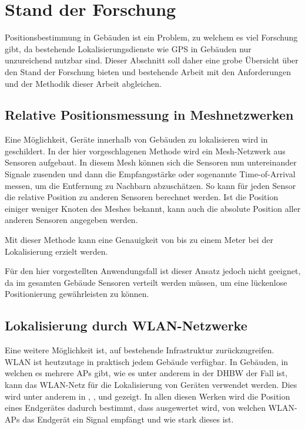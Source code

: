 \section{Stand der Forschung} \label{sec:stand-der-forschung}

Positionsbestimmung in Gebäuden ist ein Problem, zu welchem es viel Forschung gibt, da bestehende
Lokalisierungsdienste wie \gls{GPS} in Gebäuden nur unzureichend nutzbar sind. Dieser Abschnitt soll
daher eine grobe Übersicht über den Stand der Forschung bieten und bestehende Arbeit mit den
Anforderungen und der Methodik dieser Arbeit abgleichen.

\subsection{Relative Positionsmessung in Meshnetzwerken}

Eine Möglichkeit, Geräte innerhalb von Gebäuden zu lokalisieren wird in \cite{Patwari2003}
geschildert. In der hier vorgeschlagenen Methode wird ein \gls{Mesh-Netzwerk} aus Sensoren aufgebaut.
In diesem Mesh können sich die Sensoren nun untereinander Signale zusenden und dann die
Empfangsstärke oder sogenannte Time-of-Arrival messen, um die Entfernung zu Nachbarn abzuschätzen.
So kann für jeden Sensor die relative Position zu anderen Sensoren berechnet werden.
Ist die Position einiger weniger Knoten des Meshes bekannt, kann auch die absolute Position aller
anderen Sensoren angegeben werden.

Mit dieser Methode kann eine Genauigkeit von bis zu einem Meter bei der Lokalisierung erzielt
werden.

Für den hier vorgestellten Anwendungsfall ist dieser Ansatz jedoch nicht geeignet, da im gesamten
Gebäude Sensoren verteilt werden müssen, um eine lückenlose Positionierung gewährleisten zu können.

\subsection{Lokalisierung durch \gls{WLAN}-Netzwerke}

Eine weitere Möglichkeit ist, auf bestehende Infrastruktur zurückzugreifen. \Gls{WLAN} ist
heutzutage in praktisch jedem Gebäude verfügbar.
In Gebäuden, in welchen es mehrere \glspl{AP} gibt, wie es unter anderem in der \gls{DHBW} der Fall
ist, kann das \gls{WLAN}-Netz für die Lokalisierung von Geräten verwendet werden. Dies wird unter
anderem in \cite{Xiang2004}, \cite{Dong2009}, \cite{Paschalidis2009} und \cite{Liang2009} gezeigt.
In allen diesen Werken wird die Position eines Endgerätes dadurch bestimmt, dass ausgewertet wird,
von welchen \gls{WLAN}-\glspl{AP} das Endgerät ein Signal empfängt und wie stark dieses ist.

